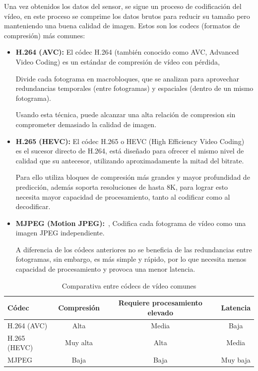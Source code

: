 Una vez obtenidos los datos del sensor, se sigue un proceso de codificación del vídeo, en este proceso se comprime los datos brutos para reducir su tamaño pero manteniendo una buena calidad de imagen.
Estos son los codecs (formatos de compresión) más comunes:
\begin{itemize}
    \item \textbf{H.264 (AVC):} El códec H.264 (también conocido como AVC, Advanced Video Coding)\cite{H.264} es un estándar de compresión de vídeo con pérdida,

    Divide cada fotograma en macrobloques, que se analizan para aprovechar redundancias temporales (entre fotogramas) y espaciales (dentro de un mismo fotograma).

    Usando esta técnica, puede alcanzar una alta relación de compresion sin comprometer demasiado la calidad de imagen.

    \item \textbf{H.265 (HEVC):} El códec H.265 o HEVC (High Efficiency Video Coding)~\cite{hevc_h265} es el sucesor directo de H.264, está diseñado para ofrecer el mismo nivel de calidad que su antecesor,
    utilizando aproximadamente la mitad del bitrate.

    Para ello utiliza bloques de compresión más grandes y mayor profundidad de predicción, además soporta resoluciones de hasta 8K, para lograr esto necesita mayor capacidad de procesamiento, tanto al codificar como al decodificar.

    \item \textbf{MJPEG (Motion JPEG):}~\cite{mjpeg_codec}, Codifica cada fotograma de vídeo como una imagen JPEG independiente.

    A diferencia de los códecs anteriores no se beneficia de las redundancias entre fotogramas, sin embargo, es más simple y rápido, por lo que necesita menos capacidad de procesamiento y provoca una menor latencia.

\end{itemize}
\begin{table}[h]
    \centering
    \footnotesize
    \begin{tabular}{|l|c|c|c|}
        \hline
        \textbf{Códec} & \textbf{Compresión} & \textbf{Requiere procesamiento elevado} & \textbf{Latencia} \\
        \hline
        H.264 (AVC)    & Alta                & Media                                   & Baja              \\
        \hline
        H.265 (HEVC)   & Muy alta            & Alta                                    & Media             \\
        \hline
        MJPEG          & Baja                & Baja                                    & Muy baja          \\
        \hline
    \end{tabular}
    \caption{Comparativa entre códecs de vídeo comunes}
    \label{tab:video_codecs}
\end{table}

